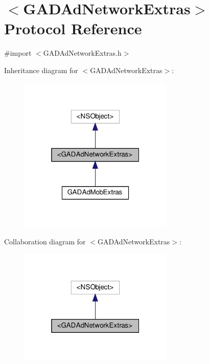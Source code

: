 \hypertarget{protocolGADAdNetworkExtras-p}{}\section{$<$G\+A\+D\+Ad\+Network\+Extras$>$ Protocol Reference}
\label{protocolGADAdNetworkExtras-p}


{\ttfamily \#import $<$G\+A\+D\+Ad\+Network\+Extras.\+h$>$}



Inheritance diagram for $<$G\+A\+D\+Ad\+Network\+Extras$>$\+:
\nopagebreak
\begin{figure}[H]
\begin{center}
\leavevmode
\includegraphics[width=208pt]{protocolGADAdNetworkExtras-p__inherit__graph}
\end{center}
\end{figure}


Collaboration diagram for $<$G\+A\+D\+Ad\+Network\+Extras$>$\+:
\nopagebreak
\begin{figure}[H]
\begin{center}
\leavevmode
\includegraphics[width=208pt]{protocolGADAdNetworkExtras-p__coll__graph}
\end{center}
\end{figure}


